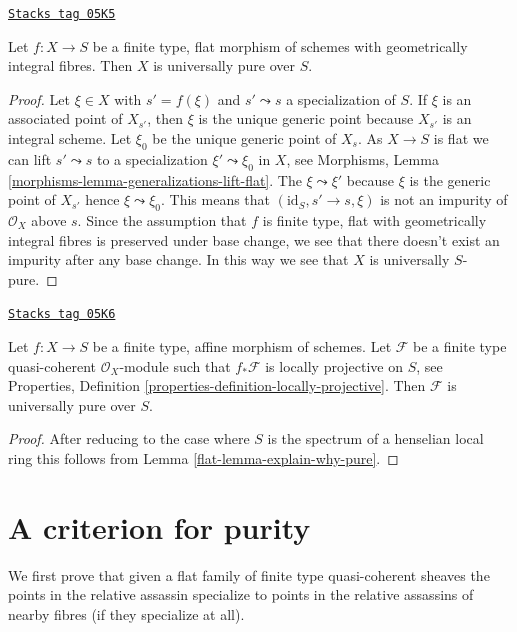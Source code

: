 \begin{lemma}
\label{flat-lemma-flat-geometrically-integral-fibres-pure}
\href{https://stacks.math.columbia.edu/tag/05K5}{\texttt{Stacks tag 05K5}}

Let $f : X \to S$ be a finite type, flat morphism of schemes
with geometrically integral fibres. Then $X$ is universally pure
over $S$.
\end{lemma}

\begin{proof}
Let $\xi \in X$ with $s' = f(\xi)$ and $s' \leadsto s$ a specialization
of $S$. If $\xi$ is an associated point of $X_{s'}$, then $\xi$ is the
unique generic point because $X_{s'}$ is an integral scheme. Let
$\xi_0$ be the unique generic point of $X_s$. As $X \to S$ is flat
we can lift $s' \leadsto s$ to a specialization
$\xi' \leadsto \xi_0$ in $X$, see
Morphisms, Lemma \ref{morphisms-lemma-generalizations-lift-flat}.
The $\xi \leadsto \xi'$ because $\xi$ is the generic point of $X_{s'}$
hence $\xi \leadsto \xi_0$. This means that $(\text{id}_S, s' \to s, \xi)$
is not an impurity of $\mathcal{O}_X$ above $s$. Since the assumption
that $f$ is finite type, flat with geometrically integral fibres
is preserved under base change, we see that there doesn't exist an
impurity after any base change. In this way we see that $X$ is
universally $S$-pure.
\end{proof}

\begin{lemma}
\label{flat-lemma-affine-locally-projective-pure}
\href{https://stacks.math.columbia.edu/tag/05K6}{\texttt{Stacks tag 05K6}}

Let $f : X \to S$ be a finite type, affine morphism of schemes.
Let $\mathcal{F}$ be a finite type quasi-coherent $\mathcal{O}_X$-module
such that $f_*\mathcal{F}$ is locally projective on $S$, see
Properties, Definition \ref{properties-definition-locally-projective}.
Then $\mathcal{F}$ is universally pure over $S$.
\end{lemma}

\begin{proof}

After reducing to the case where $S$ is the spectrum of a henselian
local ring this follows from
Lemma \ref{flat-lemma-explain-why-pure}.
\end{proof}

\section{A criterion for purity}
\label{flat-section-criterion-purity}
We first prove that given a flat family of finite type
quasi-coherent sheaves the points in the relative assassin
specialize to points in the relative assassins of nearby fibres
(if they specialize at all).

